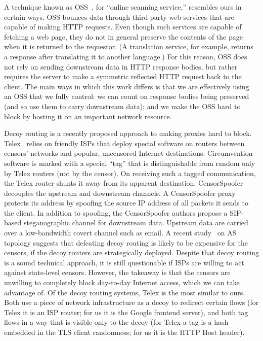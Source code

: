 \documentclass{article}
\begin{document}
A technique known as OSS~\cite{oss}, for
``online scanning service,'' resembles ours in certain ways. OSS bounces data
through third-party web services that are capable of making HTTP requests.
Even though such services are capable of fetching a web page, they do not in general
preserve the contents of the page when it is returned to the requestor.
(A translation service, for example,
returns a response after translating it to another language.)
For this reason, OSS does not rely on sending downstream data in HTTP response bodies,
but rather requires the server to make a symmetric reflected HTTP request back to the client.
The main ways in which this work differs is that we are effectively using an OSS that we fully control:
we can count on response bodies being preserved (and so use them to carry
downstream data);
and we make the OSS hard to block by hosting it on an important network resource.

Decoy routing is
a recently proposed approach to making proxies hard to block. Telex~\cite{telex}
relies on friendly ISPs that deploy special software on routers between censors' networks and
popular, uncensored Internet destinations.
Circumvention software is marked with a special ``tag'' that is distinguishable from random only
by Telex routers (not by the censor).
On receiving such a tagged communication, the Telex router shunts it away from its apparent destination.
CensorSpoofer~\cite{censorspoofer}
decouples the upstream and downstream channels. A CensorSpoofer proxy protects its address by
spoofing the source IP address of all packets it sends to the client.
In addition to spoofing, the CensorSpoofer authors propose a SIP-based steganographic channel for downstream data.
Upstream data are carried over a low-bandwidth covert channel such as email.
A recent study~\cite{nodirectionhome} on AS
topology suggests that defeating decoy routing is likely to be expensive for the
censors, if the decoy routers are strategically deployed. Despite that decoy
routing is a sound technical approach, it is still questionable if ISPs are
willing to act against state-level censors. However, the takeaway is that the
censors are unwilling to completely block day-to-day Internet access, which we
can take advantage of.
Of the decoy routing systems, Telex is the most similar to ours.
Both use a piece of network infrastructure as a decoy to redirect certain flows
(for Telex it is an ISP router; for us it is the Google frontend server),
and both tag flows in a way that is visible only to the decoy
(for Telex a tag is a hash embedded in the TLS client randomness; for us it is the HTTP Host header).
\end{document}
